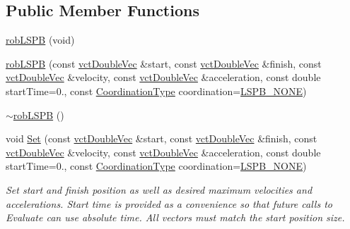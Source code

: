 \subsection*{Public Member Functions}
\begin{DoxyCompactItemize}
\item 
\hyperlink{classrob_l_s_p_b_af557abd92b0935434910d109c4759346}{rob\+L\+S\+P\+B} (void)
\item 
\hyperlink{classrob_l_s_p_b_a88699cc3a389605cda786f3e6ffb3c85}{rob\+L\+S\+P\+B} (const \hyperlink{vct_dynamic_vector_types_8h_ade4b3068c86fb88f41af2e5187e491c2}{vct\+Double\+Vec} \&start, const \hyperlink{vct_dynamic_vector_types_8h_ade4b3068c86fb88f41af2e5187e491c2}{vct\+Double\+Vec} \&finish, const \hyperlink{vct_dynamic_vector_types_8h_ade4b3068c86fb88f41af2e5187e491c2}{vct\+Double\+Vec} \&velocity, const \hyperlink{vct_dynamic_vector_types_8h_ade4b3068c86fb88f41af2e5187e491c2}{vct\+Double\+Vec} \&acceleration, const double start\+Time=0., const \hyperlink{classrob_l_s_p_b_a8feec61f7c94670dbdbe75e63dec8496}{Coordination\+Type} coordination=\hyperlink{classrob_l_s_p_b_a8feec61f7c94670dbdbe75e63dec8496a6183520633c3003062fc1a7c013ced4b}{L\+S\+P\+B\+\_\+\+N\+O\+N\+E})
\item 
\hyperlink{classrob_l_s_p_b_a9aeb4c86ed81fb50c883379e45fe8c88}{$\sim$rob\+L\+S\+P\+B} ()
\item 
void \hyperlink{classrob_l_s_p_b_afa07374ad33ea00cf5f4b2ec3d90321a}{Set} (const \hyperlink{vct_dynamic_vector_types_8h_ade4b3068c86fb88f41af2e5187e491c2}{vct\+Double\+Vec} \&start, const \hyperlink{vct_dynamic_vector_types_8h_ade4b3068c86fb88f41af2e5187e491c2}{vct\+Double\+Vec} \&finish, const \hyperlink{vct_dynamic_vector_types_8h_ade4b3068c86fb88f41af2e5187e491c2}{vct\+Double\+Vec} \&velocity, const \hyperlink{vct_dynamic_vector_types_8h_ade4b3068c86fb88f41af2e5187e491c2}{vct\+Double\+Vec} \&acceleration, const double start\+Time=0., const \hyperlink{classrob_l_s_p_b_a8feec61f7c94670dbdbe75e63dec8496}{Coordination\+Type} coordination=\hyperlink{classrob_l_s_p_b_a8feec61f7c94670dbdbe75e63dec8496a6183520633c3003062fc1a7c013ced4b}{L\+S\+P\+B\+\_\+\+N\+O\+N\+E})
\begin{DoxyCompactList}\small\item\em Set start and finish position as well as desired maximum velocities and accelerations. Start time is provided as a convenience so that future calls to Evaluate can use absolute time. All vectors must match the start position size. \end{DoxyCompactList}\item 

\end{DoxyCompactItemize}
